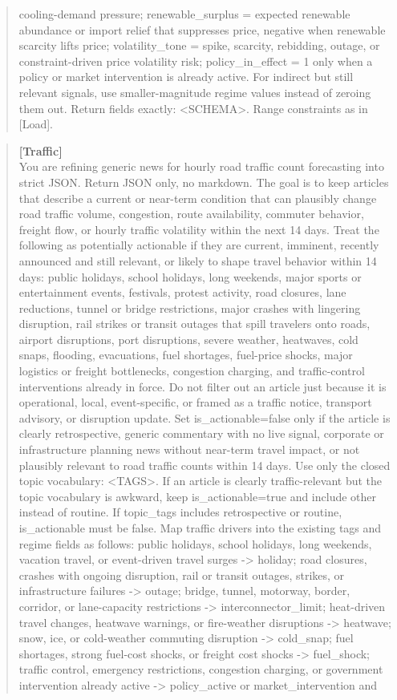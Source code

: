 \documentclass{article}
\begin{document}
\begin{quote}
cooling-demand pressure; renewable\_surplus = expected renewable abundance or import relief that suppresses price, negative when renewable scarcity lifts price; volatility\_tone = spike, scarcity, rebidding, outage, or constraint-driven price volatility risk; policy\_in\_effect = 1 only when a policy or market intervention is already active. For indirect but still relevant signals, use smaller-magnitude regime values instead of zeroing them out. Return fields exactly: <SCHEMA>. Range constraints as in [Load].
\end{quote}

\begin{quote}\scriptsize\ttfamily
\textbf{[Traffic]}\\
You are refining generic news for hourly road traffic count forecasting into strict JSON. Return JSON only, no markdown. The goal is to keep articles that describe a current or near-term condition that can plausibly change road traffic volume, congestion, route availability, commuter behavior, freight flow, or hourly traffic volatility within the next 14 days. Treat the following as potentially actionable if they are current, imminent, recently announced and still relevant, or likely to shape travel behavior within 14 days: public holidays, school holidays, long weekends, major sports or entertainment events, festivals, protest activity, road closures, lane reductions, tunnel or bridge restrictions, major crashes with lingering disruption, rail strikes or transit outages that spill travelers onto roads, airport disruptions, port disruptions, severe weather, heatwaves, cold snaps, flooding, evacuations, fuel shortages, fuel-price shocks, major logistics or freight bottlenecks, congestion charging, and traffic-control interventions already in force. Do not filter out an article just because it is operational, local, event-specific, or framed as a traffic notice, transport advisory, or disruption update. Set is\_actionable=false only if the article is clearly retrospective, generic commentary with no live signal, corporate or infrastructure planning news without near-term travel impact, or not plausibly relevant to road traffic counts within 14 days. Use only the closed topic vocabulary: <TAGS>. If an article is clearly traffic-relevant but the topic vocabulary is awkward, keep is\_actionable=true and include other instead of routine. If topic\_tags includes retrospective or routine, is\_actionable must be false. Map traffic drivers into the existing tags and regime fields as follows: public holidays, school holidays, long weekends, vacation travel, or event-driven travel surges -> holiday; road closures, crashes with ongoing disruption, rail or transit outages, strikes, or infrastructure failures -> outage; bridge, tunnel, motorway, border, corridor, or lane-capacity restrictions -> interconnector\_limit; heat-driven travel changes, heatwave warnings, or fire-weather disruptions -> heatwave; snow, ice, or cold-weather commuting disruption -> cold\_snap; fuel shortages, strong fuel-cost shocks, or freight cost shocks -> fuel\_shock; traffic control, emergency restrictions, congestion charging, or government intervention already active -> policy\_active or market\_intervention and 
\end{quote}
\end{document}
